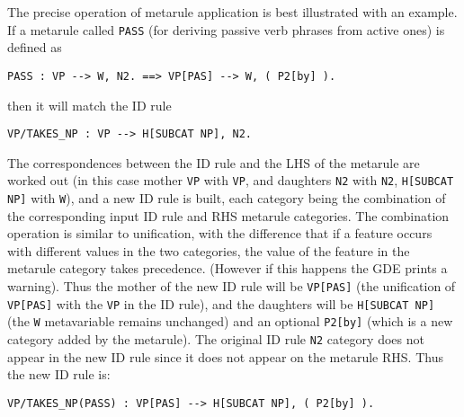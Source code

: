 The precise operation of metarule application is best illustrated with an
example. If a metarule called {\tt PASS} (for deriving passive verb
phrases from active ones) is defined as
\begin{ex}
\begin{verbatim}
PASS : VP --> W, N2. ==> VP[PAS] --> W, ( P2[by] ).
\end{verbatim}
\end{ex}
then it will match the ID rule
\begin{ex}
\begin{verbatim}
VP/TAKES_NP : VP --> H[SUBCAT NP], N2.
\end{verbatim}
\end{ex}
The correspondences between the ID rule and the LHS of the metarule are
worked out (in this case mother {\tt VP} with {\tt VP}, and
daughters {\tt N2} with {\tt N2}, {\tt H[SUBCAT NP]} with {\tt W}),
and a new ID rule is built, each category being the combination
of the corresponding input ID rule and RHS metarule categories. The
combination operation is similar to unification, with the difference
that if a feature occurs with different values in the two categories,
the value of the feature in the metarule category takes precedence.
(However if this happens the GDE prints a warning). Thus
the mother of the new ID rule will be {\tt VP[PAS]} (the unification
of {\tt VP[PAS]} with the {\tt VP} in the ID rule), and the
daughters will be {\tt H[SUBCAT NP]} (the {\tt W} metavariable
remains unchanged) and an optional {\tt P2[by]} (which is a new
category added by the metarule). The original ID rule {\tt N2} 
category does not appear in the new ID rule since it does not appear
on the metarule RHS. Thus the new ID rule is:
\begin{ex}
\begin{verbatim}
VP/TAKES_NP(PASS) : VP[PAS] --> H[SUBCAT NP], ( P2[by] ).
\end{verbatim}
\end{ex}

